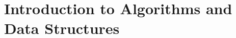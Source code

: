 \documentclass[../../book-en.tex]{subfiles}
\begin{document}
\chapter{Introduction to Algorithms and Data Structures}
\label{ch:1.3-algorithms-ds-en}














\end{document}
